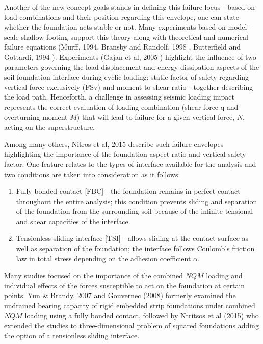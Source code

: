 \documentclass[11pt,a4paper]{report}
\begin{document}
Another of the new concept goals stands in defining this failure locus - based on load combinations and their position regarding this envelope, one can state whether the foundation acts stable or not. Many experiments based on model-scale shallow footing support this theory along with theoretical and numerical failure equations (Murff, 1994, Bransby and Randolf, 1998 \cite{bransby1998combined}, Butterfield and Gottardi, 1994 \cite{gottardi1999plastic}). Experiments (Gajan et al, 2005 \cite{gajan2005centrifuge}) highlight the influence of two \mbox{parameters} governing the load displacement and energy dissipation aspects of the soil-foundation interface during cyclic loading: static factor of safety regarding vertical force exclusively (FSv) and moment-to-shear ratio - together describing the load path. Henceforth, a challenge in assessing seismic loading impact represents the correct evaluation of loading combination (shear force \gls{q} and overturning moment $M$) that will lead to failure for a given vertical force, $N$, acting on the superstructure.

 Among many others, Nitros et al, 2015 \cite{ntritsos2015static} describe such failure envelopes highlighting the importance of the foundation aspect ratio and vertical safety factor. One feature relates to the types of interface available for the analysis and two conditions are taken into consideration as it follows:
\begin{enumerate}
	\item Fully bonded contact [FBC] - the foundation remains in perfect contact throughout the entire analysis; this condition prevents sliding and separation of the foundation from the surrounding soil because of the infinite tensional and shear capacities of the interface.
	\item Tensionless sliding interface [TSI] - allows sliding at the contact surface as well as separation of the foundation; the interface follows Coulomb's friction law in total stress depending on the adhesion coefficient $\alpha$.
\end{enumerate}

Many studies focused on the importance of the combined $NQM$ loading and individual effects of the forces susceptible to act on the foundation at certain points. Yun \& Brandy, 2007 and Gouvernec (2008) \cite{randolph2011offshore} formerly examined the undrained bearing capacity of rigid embedded strip foundations under combined $NQM$ loading using a fully bonded contact, followed by Ntritsos et al (2015) who extended the studies to three-dimensional problem of squared foundations adding the option of a tensionless sliding interface.
\end{document}
